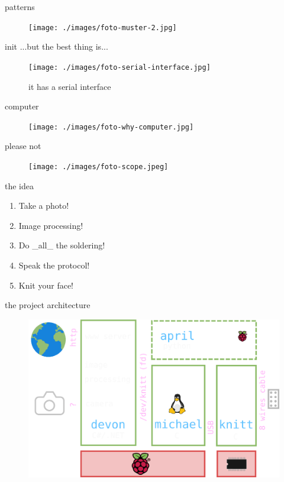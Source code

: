 \begin{frame}{patterns}
    \begin{figure}
        \texttt{[image: ./images/foto-muster-2.jpg]}
    \end{figure}
\end{frame}

\begin{frame}{init}
    ...but the best thing is...\pause
    \begin{figure}
        \texttt{[image: ./images/foto-serial-interface.jpg]}
        \caption{it has a serial interface }
    \end{figure}
\end{frame}

\begin{frame}{computer}
    \begin{figure}
        \texttt{[image: ./images/foto-why-computer.jpg]}
    \end{figure}
\end{frame}

\begin{frame}{please not}
    \begin{figure}
        \texttt{[image: ./images/foto-scope.jpeg]}
    \end{figure}
\end{frame}

\begin{frame}{the idea}
    \begin{enumerate}[<+->]
        \item Take a photo!
        \item Image processing!
        \item Do \_all\_ the soldering!
        \item Speak the protocol!
        \item Knit your face!
    \end{enumerate}
\end{frame}


\begin{frame}{the project architecture}
    \begin{figure}
        \includegraphics[width=\textwidth]{./images/architecture.png}
    \end{figure}
\end{frame}

